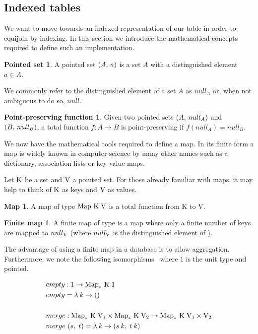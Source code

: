 \subsection{Indexed tables}
We want to move towards an indexed representation of our table in order to
equijoin by indexing. In this section we introduce the mathematical concepts required to define such an implementation.
\theoremstyle{definition}\newtheorem*{psetdef}{Pointed set}
\theoremstyle{definition}\newtheorem*{ppfuncdef}{Point-preserving function}
\theoremstyle{definition}\newtheorem*{mapdef}{Map}
\theoremstyle{definition}\newtheorem*{finitemapdef}{Finite map}
\theoremstyle{definition}\newtheorem*{indexedtabledef}{Indexed Table}
\begin{psetdef}\label{def:pset}
  A pointed set $\left(A,\,a\right)$ is a set $A$ with a distinguished element $a \in A$.
\end{psetdef}
We commonly refer to the distinguished element of a set $A$ as $null_A$ or, when not ambiguous to do so, $null$.
\begin{ppfuncdef}\label{def:ppfunc}
  Given two pointed sets $\left(A,\,null_A\right)$ and $\left(B,\,null_B\right)$, a total function $f: A \rightarrow B$ is point-preserving if $f(null_A) = null_B$.
\end{ppfuncdef}

We now have the mathematical tools required to define a map. In its finite form a map is widely known in computer science by many other names such as a dictionary, association lists or key-value maps.

Let $\mathrm{K}$ be a set and $\mathrm{V}$ a pointed set. For those already familiar with maps, it may help to think of $\mathrm{K}$ as keys and $\mathrm{V}$ as values.
\begin{mapdef}
  A map of type $\mathrm{Map}\ \mathrm{K}\;\mathrm{V}$ is a total function from K to V.
\end{mapdef}
\begin{finitemapdef}
  A finite map of type \finitemap{\keyset}{\valset} is a map where only a finite number of keys are mapped to $null_{\mathrm{V}}$ (where $null_{\mathrm{V}}$ is the distinguished element of \valset). 
\end{finitemapdef}
The advantage of using a finite map in a database is to allow aggregation.
Furthermore, we note the following
isomorphisms~\cite{RelationalAlgebraByWayOfAdjunctions} where $1$ is the unit
type and pointed.

\begin{equation*}
\begin{split}
    & empty: 1 \rightarrow \mathrm{Map}_*\ \mathrm{K}\;1 \\
    & empty = \lambda\:k \rightarrow () \\
    \\
    & merge: \mathrm{Map}_*\ \mathrm{K}\;\mathrm{V}_1 \times \mathrm{Map}_*\ \mathrm{K}\;\mathrm{V}_2
             \rightarrow \mathrm{Map}_*\ \mathrm{K}\;\mathrm{V}_1 \times \mathrm{V}_2 \\
    & merge\ (s,\;t) = \lambda\:k \rightarrow (s\:k,\;t\:k) \\
\end{split}
\end{equation*}

